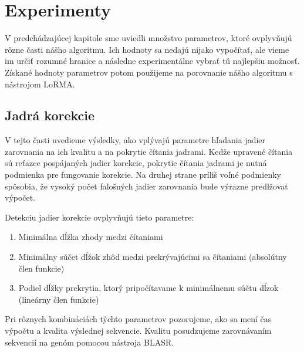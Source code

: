 \chapter{Experimenty}

V predchádzajúcej kapitole sme uviedli množstvo parametrov, ktoré ovplyvňujú rôzne časti nášho algoritmu. Ich hodnoty sa nedajú nijako vypočítať, ale vieme im určiť rozumné hranice a následne experimentálne vybrať tú najlepšiu možnosť. Získané hodnoty parametrov potom použijeme na porovnanie nášho algoritmu s nástrojom LoRMA.

\section{Jadrá korekcie}

V tejto časti uvedieme výsledky, ako vplývajú parametre hľadania jadier zarovnania na ich kvalitu a na pokrytie čítania jadrami. Kedže upravené čítania sú reťazce pospájaných jadier korekcie, pokrytie čítania jadrami je nutná podmienka pre fungovanie korekcie. Na druhej strane príliš voľné podmienky spôsobia, že vysoký počet falošných jadier zarovnania bude výrazne predlžovať výpočet.

Detekciu jadier korekcie ovplyvňujú tieto parametre:

\begin{enumerate}[label={P.\arabic*}]
\item \label{dlzka_kmerov} Minimálna dĺžka zhody medzi čítaniami
\item \label{absolutny_clen} Minimálny súčet dĺžok zhôd medzi prekrývajúcimi sa čítaniami (absolútny člen funkcie)
\item \label{linearny_clen} Podiel dĺžky prekrytia, ktorý pripočítavame k minimálnemu súčtu dĺzok (lineárny člen funkcie)
\end{enumerate}

Pri rôznych kombináciách týchto parametrov pozorujeme, ako sa mení čas výpočtu a kvalita výslednej sekvencie. Kvalitu posudzujeme zarovnávaním sekvencií na genóm pomocou nástroja BLASR. 

